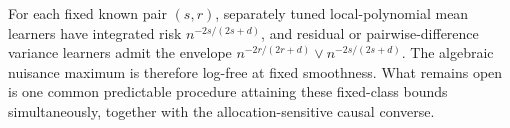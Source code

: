 For each fixed known pair \((s,r)\), separately tuned local-polynomial mean learners have integrated risk \(n^{-2s/(2s+d)}\), and residual or pairwise-difference variance learners admit the envelope \(n^{-2r/(2r+d)}\vee n^{-2s/(2s+d)}\).  The algebraic nuisance maximum is therefore log-free at fixed smoothness.  What remains open is one common predictable procedure attaining these fixed-class bounds simultaneously, together with the allocation-sensitive causal converse.